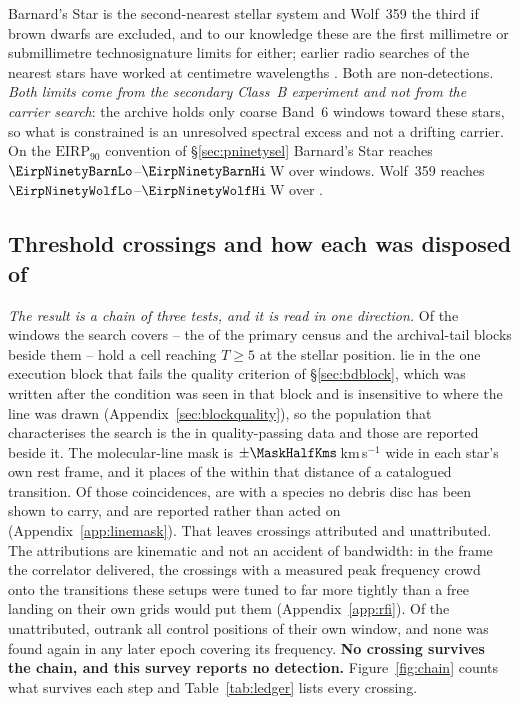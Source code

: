 Barnard's Star is the second-nearest stellar system and Wolf~359 the third if
brown dwarfs are excluded, and to our knowledge these are the first millimetre
or submillimetre technosignature limits for either; earlier radio searches of
the nearest stars have worked at centimetre wavelengths \citep{Enriquez2017,
Price2020, Margot2023}. Both are non-detections. \emph{Both limits come from
the secondary Class~B experiment and not from the carrier search}: the archive
holds only coarse Band~6 windows toward these stars, so what is constrained is
an unresolved spectral excess and not a drifting carrier. On the $\mathrm{EIRP}_{90}$ convention of \S\ref{sec:pninetysel}
Barnard's Star reaches $\EirpNinetyBarnLo$--$\EirpNinetyBarnHi$\,W over
\NWinBarn{} windows. Wolf~359 reaches
$\EirpNinetyWolfLo$--$\EirpNinetyWolfHi$\,W over \NWinWolf.

\subsection{Threshold crossings and how each was disposed of}
\label{sec:technosearch}

\emph{The result is a chain of three tests, and it is read in one direction.}
Of the windows the search covers -- the \NWindows{} of the primary census
and the archival-tail blocks beside them -- \EvNCrossRaw{} hold a cell
reaching $T\geq5$ at the stellar position. \EvNCrossFlag{} lie in the one
execution block that fails the quality criterion of \S\ref{sec:bdblock}, which
was written after the condition was seen in that block and is insensitive to
where the line was drawn (Appendix~\ref{sec:blockquality}), so the population
that characterises the search is the \EvNCrossQp{} in quality-passing data and
those \EvNCrossFlag{} are reported beside it. The molecular-line mask is $\pm\MaskHalfKms$\,km\,s$^{-1}$ wide in each
star's own rest frame, and it places \MkNCoinc{} of the \EvNCrossQp{} within
that distance of a catalogued transition. Of those coincidences, \MkNSODecideWord{} are with a species no debris disc
has been shown to carry, and are reported rather than acted on
(Appendix~\ref{app:linemask}). That leaves
\EvNAttrQp{} crossings attributed and \EvNUnattrQp{} unattributed. The attributions are kinematic and not an accident of bandwidth: in the
frame the correlator delivered, the crossings with a measured peak frequency
crowd onto the transitions these setups were tuned to far more tightly than a
free landing on their own grids would put them (Appendix~\ref{app:rfi}). Of the unattributed,
\EvNRankQp{} outrank all \NCtrl{} control positions of their own window, and
none was found again in any later epoch covering its frequency. \textbf{No
crossing survives the chain, and this survey reports no detection.}
Figure~\ref{fig:chain} counts what survives each step and
Table~\ref{tab:ledger} lists every crossing.

